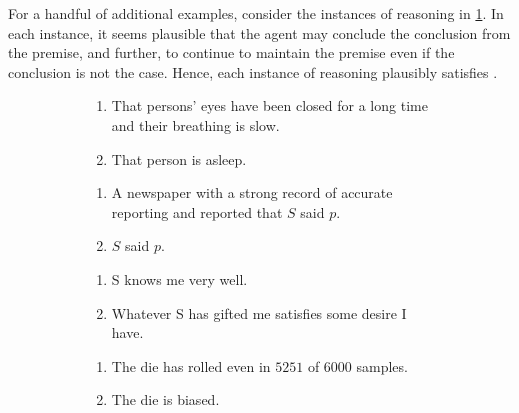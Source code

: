 \begin{note}
  For a handful of additional examples, consider the instances of reasoning in \ref{fig:ideaCSA:basic-examples}.
  In each instance, it seems plausible that the agent may conclude the conclusion from the premise, and further, to continue to maintain the premise even if the conclusion is not the case.
  Hence, each instance of reasoning plausibly satisfies \ideaCSA{}.

  \begin{figure}[h!]
    \mbox{}\hfill
    \begin{subfigure}{0.45\linewidth}
      \begin{enumerate}
      \item That persons' eyes have been closed for a long time and their breathing is slow.
      \item That person is asleep.
      \end{enumerate}
      \caption{}
    \end{subfigure}
    \hfill
    \begin{subfigure}{0.45\linewidth}
      \begin{enumerate}
      \item A newspaper with a strong record of accurate reporting and reported that \(S\) said \(p\).
      \item \(S\) said \(p\).
      \end{enumerate}
      \caption{}
    \end{subfigure}
    \hfill\mbox{}

    \mbox{}\hfill
    \begin{subfigure}{0.45\linewidth}
      \begin{enumerate}
      \item S knows me very well.
      \item Whatever S has gifted me satisfies some desire I have.
      \end{enumerate}
      \caption{}
    \end{subfigure}
    \hfill
    \begin{subfigure}{0.45\linewidth}
      \begin{enumerate}
      \item The die has rolled even in \(5251\) of \(6000\) samples.
      \item The die is biased.
      \end{enumerate}
      \caption{}
    \end{subfigure}
    \hfill\mbox{}
    \caption{}
    \label{fig:ideaCSA:basic-examples}
  \end{figure}
\end{note}

